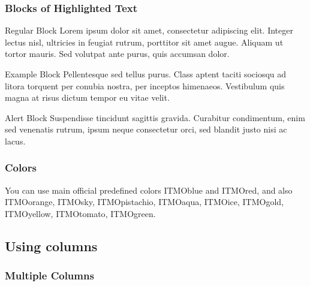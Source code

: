 \documentclass[aspectratio=169]{beamer}
\begin{document}
\begin{frame}
\frametitle{Blocks of Highlighted Text}
\begin{block}{Regular Block}
Lorem ipsum dolor sit amet, consectetur adipiscing elit. Integer lectus nisl, ultricies in feugiat rutrum, porttitor sit amet augue. Aliquam ut tortor mauris. Sed volutpat ante purus, quis accumsan dolor.
\end{block}

\begin{exampleblock}{Example Block}
Pellentesque sed tellus purus. Class aptent taciti sociosqu ad litora torquent per conubia nostra, per inceptos himenaeos. Vestibulum quis magna at risus dictum tempor eu vitae velit.
\end{exampleblock}

\begin{alertblock}{Alert Block}
Suspendisse tincidunt sagittis gravida. Curabitur condimentum, enim sed venenatis rutrum, ipsum neque consectetur orci, sed blandit justo nisi ac lacus.
\end{alertblock}
\end{frame}


\begin{frame}
\frametitle{Colors}

You can use main official predefined colors
\textcolor{ITMOblue}{ITMOblue} and \textcolor{ITMOred}{ITMOred}, and also
 \textcolor{ITMOorange}{ITMOorange}, \textcolor{ITMOsky}{ITMOsky}, \textcolor{ITMOpistachio}{ITMOpistachio}, \textcolor{ITMOaqua}{ITMOaqua}, \textcolor{ITMOice}{ITMOice}, \textcolor{ITMOgold}{ITMOgold}, \textcolor{ITMOyellow}{ITMOyellow}, \textcolor{ITMOtomato}{ITMOtomato}, \textcolor{ITMOgreen}{ITMOgreen}.

\end{frame}



\subsection{Using columns}


\begin{frame}
\frametitle{Multiple Columns}
\begin{columns}[c]



\end{columns}
\end{frame}
\end{document}
